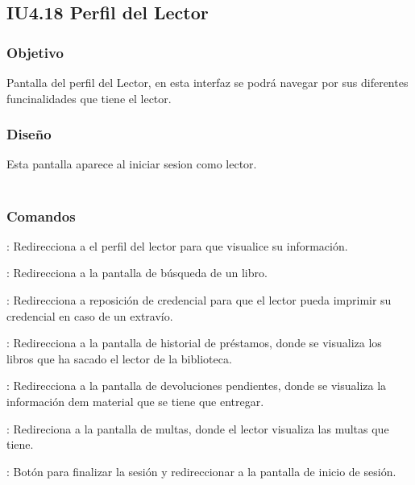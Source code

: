 \newpage
\subsection{IU4.18 Perfil del Lector}

\subsubsection{Objetivo}
	Pantalla del perfil del Lector, en esta interfaz se podrá navegar por sus diferentes funcinalidades que tiene el lector.  

\subsubsection{Diseño}
	Esta pantalla aparece al iniciar sesion como lector.  \\\\



\subsubsection{Comandos}
	\begin{Citemize}
		\item {}: Redirecciona a el perfil del lector para que visualice su información. 
		\item {}: Redirecciona a la pantalla de búsqueda de un libro.
		\item {}: Redirecciona a reposición de credencial para que el lector pueda imprimir su credencial en caso de un extravío.
		\item {}: Redirecciona a la pantalla de historial de préstamos, donde se visualiza los libros que ha sacado el lector de la biblioteca.
		\item {}: Redirecciona a la pantalla de devoluciones pendientes, donde se visualiza la información dem material que se tiene que entregar.
		\item {}: Redireciona a la pantalla de multas, donde el lector visualiza las multas que tiene.
		\item {}: Botón para finalizar la sesión y redireccionar a la pantalla de inicio de sesión.
	\end{Citemize}